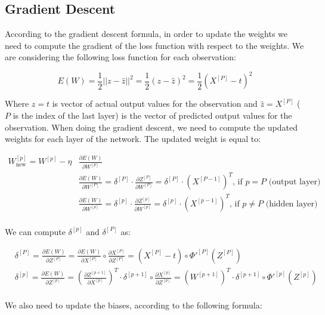 \documentclass{article}
\begin{document}
\subsection*{Gradient Descent}

According to the gradient descent formula, in order to update the weights we need to compute the gradient of the loss function with respect to the weights.
We are considering the following loss function for each observation:

\[ E(W) = \frac{1}{2} || z-\hat{z} ||^2 = \frac{1}{2} (z-\hat{z})^2 = \frac{1}{2} (X^{[P]} - t)^2 \]


Where $z = t$ is vector of actual output values for the observation and $\hat{z} = X^{[P]}$ ($P$ is the index of the last layer) is the vector of predicted output values for the observation. 
When doing the gradient descent, we need to compute the updated weights for each layer of the network.
The updated weight is equal to:

\begin{align*}
    W^{[p]}_{\text{new}} = W^{[p]} - \eta &\frac{\partial E(W)}{\partial W^{[p]}} \\
    &\frac{\partial E(W)}{\partial W^{[P]}} = \delta^{[P]} \cdot \frac{\partial Z^{[P]}}{\partial W^{[P]}} = \delta^{[P]} \cdot (X^{[P-1]})^T  \text{,      if } p = P \text{ (output layer)} \\
    &\frac{\partial E(W)}{\partial W^{[p]}} = \delta^{[p]} \cdot \frac{\partial Z^{[p]}}{\partial W^{[p]}} = \delta^{[p]} \cdot (X^{[p-1]})^T  \text{,      if } p \neq P \text{ (hidden layer)} \\
\end{align*}

We can compute $\delta^{[p]}$ and $\delta^{[P]}$ as:

\begin{align*}
    &\delta^{[P]} = \frac{\partial E(W)}{\partial Z^{[P]}} = \frac{\partial E(W)}{\partial X^{[P]}} \circ \frac{\partial X^{[P]}}{\partial Z^{[P]}} = (X^{[P]}-t) \circ \Phi'^{[P]}(Z^{[P]}) \\
    &\delta^{[p]} = \frac{\partial E(W)}{\partial Z^{[p]}} = \left( \frac{\partial Z^{[p+1]}}{\partial X^{[p]}} \right)^T \cdot \delta^{[p+1]} \circ \frac{\partial X^{[p]}}{\partial Z^{[p]}} = (W^{[p+1]})^T \cdot \delta^{[p+1]} \circ \Phi'^{[p]}(Z^{[p]}) \\
\end{align*}

We also need to update the biases, according to the following formula:
\end{document}

